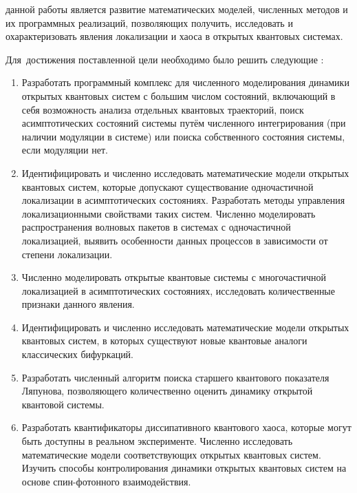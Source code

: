 {\aim} данной работы является развитие математических моделей, численных методов и их программных реализаций, позволяющих получить, исследовать и охарактеризовать явления локализации и хаоса в открытых квантовых системах.

Для~достижения поставленной цели необходимо было решить следующие {\tasks}:
\begin{enumerate}[beginpenalty=10000] %
	\item Разработать программный комплекс для численного моделирования динамики открытых квантовых систем с большим числом состояний, включающий в себя возможность анализа отдельных квантовых траекторий, поиск асимптотических состояний системы путём численного интегрирования (при наличии модуляции в системе) или поиска собственного состояния системы, если модуляции нет.
	\item Идентифицировать и численно исследовать математические модели открытых квантовых систем, которые допускают существование одночастичной локализации в асимптотических состояниях. Разработать методы управления локализационными свойствами таких систем. Численно моделировать распространения волновых пакетов в системах с одночастичной локализацией, выявить особенности данных процессов в зависимости от степени локализации.
	\item Численно моделировать открытые квантовые системы с многочастичной локализацией в асимптотических состояниях, исследовать количественные признаки данного явления.
	\item Идентифицировать и численно исследовать математические модели открытых квантовых систем, в которых существуют новые квантовые аналоги классических бифуркаций.
	\item Разработать численный алгоритм поиска старшего квантового показателя Ляпунова, позволяющего количественно оценить динамику открытой квантовой системы.
	\item Разработать квантификаторы диссипативного квантового хаоса, которые могут быть доступны в реальном эксперименте. Численно исследовать математические модели соответствующих открытых квантовых систем. Изучить способы контролирования динамики открытых квантовых систем на основе спин-фотонного взаимодействия. 
\end{enumerate}



